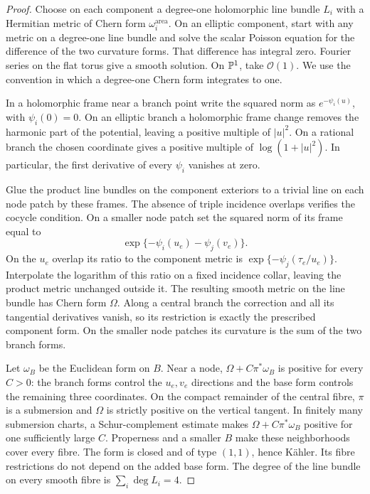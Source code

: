 \begin{proof}
Choose on each component a degree-one holomorphic line bundle $L_i$ with
a Hermitian metric of Chern form $\omega_i^{\mathrm{area}}$. On an
elliptic component, start with any metric on a degree-one line bundle and
solve the scalar Poisson equation for the difference of the two curvature
forms. That difference has integral zero. Fourier series on the flat
torus give a smooth solution. On $\mathbb P^1$, take $\mathcal O(1)$.
We use the convention in which a degree-one Chern form integrates to one.

In a holomorphic frame near a branch point write the squared norm as
$e^{-\psi_i(u)}$, with $\psi_i(0)=0$. On an elliptic branch a
holomorphic frame change removes the harmonic part of the potential,
leaving a positive multiple of $|u|^2$. On a rational branch the chosen
coordinate gives a positive multiple of $\log(1+|u|^2)$. In particular,
the first derivative of every $\psi_i$ vanishes at zero.

Glue the product line bundles on the component exteriors to a trivial
line on each node patch by these frames. The absence of triple incidence
overlaps verifies the cocycle condition. On a smaller node patch set the
squared norm of its frame equal to
\[
 \exp\{-\psi_i(u_e)-\psi_j(v_e)\}.
\]
On the $u_e$ overlap its ratio to the component metric is
$\exp\{-\psi_j(\tau_e/u_e)\}$. Interpolate the logarithm of this
ratio on a fixed incidence collar, leaving the product metric unchanged
outside it. The resulting smooth metric on the line bundle has Chern
form $\Omega$. Along a central branch the correction and all its
tangential derivatives vanish, so its restriction is exactly the
prescribed component form. On the smaller node patches its curvature is
the sum of the two branch forms.

Let $\omega_B$ be the Euclidean form on $B$. Near a node,
$\Omega+C\pi^*\omega_B$ is positive for every $C>0$: the branch
forms control the $u_e,v_e$ directions and the base form controls the
remaining three coordinates. On the compact remainder of the central
fibre, $\pi$ is a submersion and $\Omega$ is strictly positive on the
vertical tangent. In finitely many submersion charts, a Schur-complement
estimate makes $\Omega+C\pi^*\omega_B$ positive for one sufficiently
large $C$. Properness and a smaller $B$ make these neighborhoods cover
every fibre. The form is closed and of type $(1,1)$, hence K\"ahler.
Its fibre restrictions do not depend on the added base form. The degree
of the line bundle on every smooth fibre is $\sum_i\deg L_i=4$.
\end{proof}

